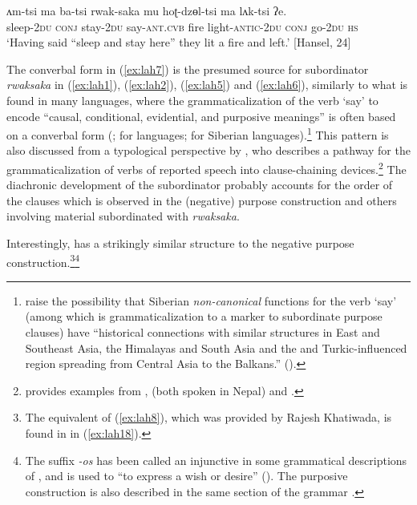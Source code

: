 \documentclass[output=paper,colorlinks,citecolor=brown]{langscibook}
\begin{document}
\ea \label{ex:lah7}
\gll ʌm-tsi ma ba-tsi rwak-saka mu hoʈ-dzɵl-tsi ma lʌk-tsi ʔe. \\
sleep-\textsc{2du} \textsc{conj} stay-\textsc{2du} say-\textsc{ant.cvb} fire light-\textsc{antic-2du} \textsc{conj} go-\textsc{2du} \textsc{hs} \\
\glt `Having said ``sleep and stay here'' they lit a fire and left.' [Hansel, 24]
\z

\noindent The converbal form in (\ref{ex:lah7}) is the presumed source for subordinator \textit{rwaksaka} in (\ref{ex:lah1}), (\ref{ex:lah2}), (\ref{ex:lah5}) and (\ref{ex:lah6}), similarly to what is found in many  languages, where the grammaticalization of the verb `say' to encode ``causal, conditional, evidential, and purposive meanings'' \citep[202]{Coupe2018} is often based on a converbal form (\citealt[200--201]{Coupe2018}; \citealt{Chappell2008} for  languages; \citealt{MaticPakendorf2013} for Siberian languages).\footnote{\citeauthor{MaticPakendorf2013} raise the possibility that Siberian \textit{non-canonical} functions for the verb `say' (among which is grammaticalization to a marker to subordinate purpose clauses) have ``historical connections with similar structures in East and Southeast Asia, the Himalayas and South Asia and the  and Turkic-influenced region spreading from Central Asia to the Balkans.'' (\citealt[358]{MaticPakendorf2013}).} This pattern is also discussed from a typological perspective by \citet[387--390]{Aikhenvald2009}, who describes a pathway for the grammaticalization of verbs of reported speech into clause-chaining devices.\footnote{\citeauthor{Aikhenvald2009} provides examples from ,  (both spoken in Nepal) and .} The diachronic development of the subordinator probably accounts for the order of the clauses which is observed in the (negative) purpose construction and others involving material subordinated with \textit{rwaksaka}.

Interestingly,  has a strikingly similar structure to the  negative purpose construction.\footnote{The equivalent of (\ref{ex:lah8}), which was provided by Rajesh Khatiwada, is found in  in (\ref{ex:lah18}).}\footnote{The suffix \textit{-os} has been called an injunctive in some grammatical descriptions of , and is used to ``to express a wish or desire'' (\citealt[197]{Matthews1998}). The purposive construction is also described in the same section of the grammar \citep[199]{Matthews1998}.}
\end{document}
